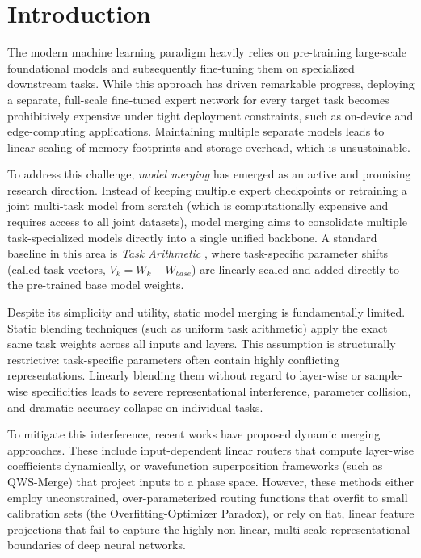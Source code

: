 \section{Introduction}
\label{sec:intro}

The modern machine learning paradigm heavily relies on pre-training large-scale foundational models and subsequently fine-tuning them on specialized downstream tasks. While this approach has driven remarkable progress, deploying a separate, full-scale fine-tuned expert network for every target task becomes prohibitively expensive under tight deployment constraints, such as on-device and edge-computing applications. Maintaining multiple separate models leads to linear scaling of memory footprints and storage overhead, which is unsustainable.

To address this challenge, \emph{model merging} has emerged as an active and promising research direction. Instead of keeping multiple expert checkpoints or retraining a joint multi-task model from scratch (which is computationally expensive and requires access to all joint datasets), model merging aims to consolidate multiple task-specialized models directly into a single unified backbone. A standard baseline in this area is \emph{Task Arithmetic} \cite{ilharco2022editing}, where task-specific parameter shifts (called task vectors, $V_k = W_k - W_{base}$) are linearly scaled and added directly to the pre-trained base model weights.

Despite its simplicity and utility, static model merging is fundamentally limited. Static blending techniques (such as uniform task arithmetic) apply the exact same task weights across all inputs and layers. This assumption is structurally restrictive: task-specific parameters often contain highly conflicting representations. Linearly blending them without regard to layer-wise or sample-wise specificities leads to severe representational interference, parameter collision, and dramatic accuracy collapse on individual tasks.

To mitigate this interference, recent works have proposed dynamic merging approaches. These include input-dependent linear routers that compute layer-wise coefficients dynamically, or wavefunction superposition frameworks (such as QWS-Merge) that project inputs to a phase space. However, these methods either employ unconstrained, over-parameterized routing functions that overfit to small calibration sets (the Overfitting-Optimizer Paradox), or rely on flat, linear feature projections that fail to capture the highly non-linear, multi-scale representational boundaries of deep neural networks.

